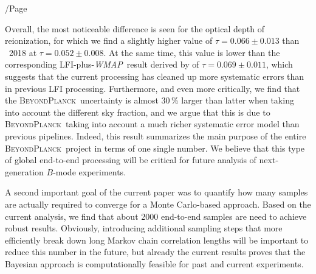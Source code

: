 /Page\documentclass[twocolumn]{aa}
\def\WMAP{\textit{WMAP}}
\newcommand{\BP}{\textsc{BeyondPlanck}}
\begin{document}
Overall, the most noticeable difference is seen for the optical depth
of reionization, for which we find a slightly higher value of
$\tau=0.066\pm0.013$ than \Planck\ 2018 at $\tau=0.052\pm0.008$. At
the same time, this value is lower than the corresponding
LFI-plus-\WMAP\ result derived by \citet{natale:2020} of
$\tau=0.069\pm0.011$, which suggests that the current processing has
cleaned up more systematic errors than in previous LFI
processing. Furthermore, and even more critically, we find that the
\BP\ uncertainty is almost 30\,\% larger than latter when taking into
account the different sky fraction, and we argue that this is
due to \BP\ taking into account a much richer systematic error model
than previous pipelines. Indeed, this result summarizes the main
purpose of the entire \BP\ project in terms of one single number. We
believe that this type of global end-to-end processing will be
critical for future analysis of next-generation $B$-mode experiments.

A second important goal of the current paper was to quantify how many
samples are actually required to converge for a Monte Carlo-based
approach. Based on the current analysis, we find that about 2000
end-to-end samples are need to achieve robust results. Obviously,
introducing additional sampling steps that more efficiently break down
long Markov chain correlation lengths will be important to reduce this
number in the future, but already the current results proves that the
Bayesian approach is computationally feasible for past and current
experiments. 






\raggedright
\end{document}
